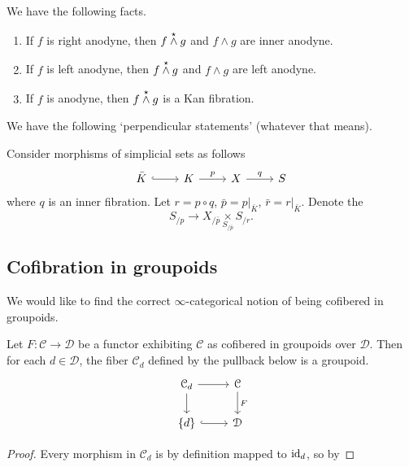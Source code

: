 \documentclass[main.tex]{subfiles}
\begin{document}
\begin{fact}
  We have the following facts.
  \begin{enumerate}
    \item If $f$ is right anodyne, then $f \overset{\star}{\wedge} g$ and $f \wedge g$ are inner anodyne.

    \item If $f$ is left anodyne, then $f \overset{\star}{\wedge} g$ and $f \wedge g$ are left anodyne.

    \item If $f$ is anodyne, then $f \overset{\star}{\wedge} g$ is a Kan fibration.
  \end{enumerate}
\end{fact}

We have the following `perpendicular statements' (whatever that means).

\begin{fact}
  Consider morphisms of simplicial sets as follows
  \begin{equation*}
    \begin{tikzcd}
      \bar{K}
      \arrow[r, hookrightarrow]
      & K
      \arrow[r, "p"]
      & X
      \arrow[r, "q"]
      & S
    \end{tikzcd}
  \end{equation*}
  where $q$ is an inner fibration. Let $r = p \circ q$, $\bar{p} = p|_{\bar{K}}$, $\bar{r} = r|_{\bar{K}}$. Denote the
  \begin{equation*}
    S_{/p} \to X_{/\bar{p}} \underset{S_{/\bar{p}}}{\times} S_{/r}.
  \end{equation*}
\end{fact}

\subsection{Cofibration in groupoids}
\label{ssc:cofibration_in_groupoids}

We would like to find the correct $\infty$-categorical notion of being cofibered in groupoids.

\begin{lemma}
  \label{lemma:fiber_of_category_cofibered_in_groupoids_is_groupoid}
  Let $F\colon \mathcal{C} \to \mathcal{D}$ be a functor exhibiting $\mathcal{C}$ as cofibered in groupoids over $\mathcal{D}$. Then for each $d \in \mathcal{D}$, the fiber $\mathcal{C}_{d}$ defined by the pullback below is a groupoid.
  \begin{equation*}
    \begin{tikzcd}
      \mathcal{C}_{d}
      \arrow[r]
      \arrow[d]
      & \mathcal{C}
      \arrow[d, "F"]
      \\
      \{d\}
      \arrow[r, hookrightarrow]
      & \mathcal{D}
    \end{tikzcd}
  \end{equation*}
\end{lemma}
\begin{proof}
  Every morphism in $\mathcal{C}_{d}$ is by definition mapped to $\mathrm{id}_{d}$, so by
\end{proof}
\end{document}
